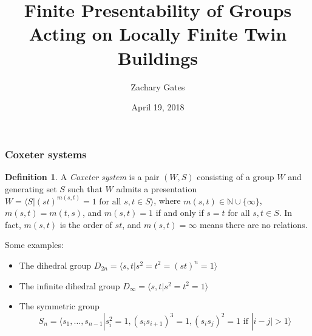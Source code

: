 \documentclass[xcolor=dvipsnames]{beamer}
\title[Finite Presentability of Groups Acting on Twin Buildings]{Finite Presentability of Groups Acting on Locally Finite Twin Buildings}
\author{Zachary Gates}
\institute{Department of Mathematics\\University of Virginia}
\date{April 19, 2018}
\newcommand{\FF}{\mathbb{F}}
\newcommand{\SL}{\mathrm{SL}}
\theoremstyle{definition}
\newtheorem{Defn}[Theo]{Definition}
\begin{document}
\begin{frame}
  \titlepage
\end{frame}



%

\begin{frame}
\frametitle{Coxeter systems}
\begin{Defn}
A \textit{Coxeter system} is a pair $(W,S)$ consisting of a group $W$ and generating set $S$ such that $W$ admits a presentation $W = \langle S | (st)^{m(s,t)}=1\text{ for all }s,t\in S\rangle$, where $m(s,t)\in \mathbb{N}\cup \{\infty\}$, $m(s,t) = m(t,s)$, and $m(s,t) = 1$ if and only if $s=t$ for all $s,t\in S$. In fact, $m(s,t)$ is the order of $st$, and $m(s,t)=\infty$ means there are no relations.
\end{Defn}
\smallskip

Some examples:
\begin{itemize}
\item The dihedral group $D_{2n} =  \langle s, t| s^2 = t^2 = (st)^n = 1 \rangle$
\item The infinite dihedral group $D_{\infty} = \langle s,t| s^2 = t^2 = 1\rangle$
\item The symmetric group $$S_n = \langle s_1,\ldots, s_{n-1}|s_i^2 = 1, (s_i s_{i+1})^3 =1, (s_i s_j)^2 = 1\text{ if } |i-j|> 1\rangle$$
\end{itemize}

\end{frame}
\end{document}
